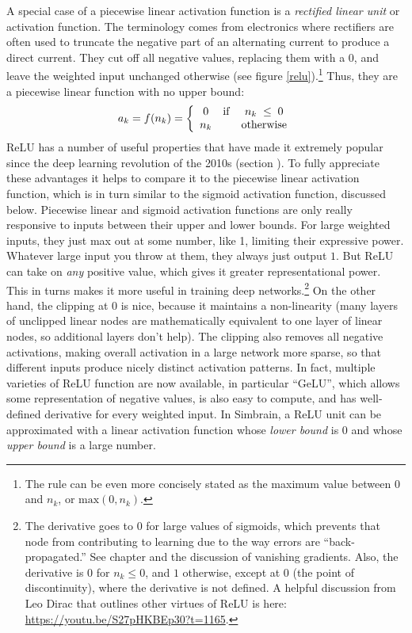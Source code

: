 A special case of a piecewise linear activation function is a \emph{rectified linear unit} or  activation function. The terminology comes from electronics where rectifiers are often used to truncate the negative part of an alternating current to produce a direct current. They cut off all negative values, replacing them with a 0, and leave the weighted input unchanged otherwise (see figure \ref{relu}).\footnote{The rule can be even more concisely stated as the maximum value between 0 and $n_k$, or $\mbox{max}(0,n_k)$.} Thus, they are a piecewise linear function with no upper bound:
\begin{eqnarray*}
a_k = f(n_k) =  
\left\{
      \begin{array}{clc}
                  0      & {\rm if} &   n_k\; \leq \; 0          \\  
              n_k  &  &  \mbox{otherwise}	
      \end{array} 
\right.
\end{eqnarray*}
ReLU has a number of useful properties that have made it extremely popular since the deep learning revolution of the 2010s (section ). To fully appreciate these advantages it helps to compare it to the piecewise linear activation function, which is in turn similar to the sigmoid activation function, discussed below. Piecewise linear and sigmoid activation functions are only really responsive to inputs between their upper and lower bounds. For large weighted inputs, they just max out at some number, like 1, limiting their expressive power. Whatever large input you throw at them, they always just output $1$. But ReLU can take on \emph{any} positive value, which gives it greater representational power. This in turns makes it more useful in training deep networks.\footnote{The derivative goes to 0 for large values of sigmoids, which prevents that node from contributing to learning due to the way errors are ``back-propagated.''  See chapter  and the discussion of vanishing gradients. Also, the derivative is $0$ for $n_k \leq 0$, and $1$ otherwise, except at $0$ (the point of discontinuity), where the derivative is not defined.  A helpful discussion from Leo Dirac that outlines other virtues of ReLU is here: \url{https://youtu.be/S27pHKBEp30?t=1165}. }  On the other hand, the clipping at $0$ is nice, because it maintains a non-linearity (many layers of unclipped linear nodes are mathematically equivalent to one layer of linear nodes, so additional layers don't help). The clipping also removes all negative activations, making overall activation in a large network more sparse, so that different inputs produce nicely distinct activation patterns. In fact, multiple varieties of ReLU function are now available, in particular ``GeLU'', which allows some representation of negative values, is also easy to compute, and has well-defined derivative for every weighted input.  In Simbrain, a ReLU unit can be approximated with a linear activation function whose \emph{lower bound} is 0 and whose \emph{upper bound} is a large number.

